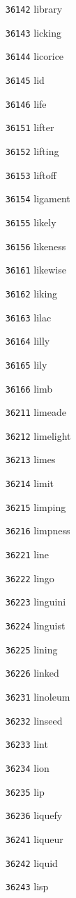 \documentclass[twoside,11pt]{article}
\begin{document}
\begin{multicols}{5}
\begin{enumerate}
\item[\texttt{36142}] library
\item[\texttt{36143}] licking
\item[\texttt{36144}] licorice
\item[\texttt{36145}] lid
\item[\texttt{36146}] life
\item[\texttt{36151}] lifter
\item[\texttt{36152}] lifting
\item[\texttt{36153}] liftoff
\item[\texttt{36154}] ligament
\item[\texttt{36155}] likely
\item[\texttt{36156}] likeness
\item[\texttt{36161}] likewise
\item[\texttt{36162}] liking
\item[\texttt{36163}] lilac
\item[\texttt{36164}] lilly
\item[\texttt{36165}] lily
\item[\texttt{36166}] limb
\item[\texttt{36211}] limeade
\item[\texttt{36212}] limelight
\item[\texttt{36213}] limes
\item[\texttt{36214}] limit
\item[\texttt{36215}] limping
\item[\texttt{36216}] limpness
\item[\texttt{36221}] line
\item[\texttt{36222}] lingo
\item[\texttt{36223}] linguini
\item[\texttt{36224}] linguist
\item[\texttt{36225}] lining
\item[\texttt{36226}] linked
\item[\texttt{36231}] linoleum
\item[\texttt{36232}] linseed
\item[\texttt{36233}] lint
\item[\texttt{36234}] lion
\item[\texttt{36235}] lip
\item[\texttt{36236}] liquefy
\item[\texttt{36241}] liqueur
\item[\texttt{36242}] liquid
\item[\texttt{36243}] lisp

\end{enumerate}
\end{multicols}
\end{document}
